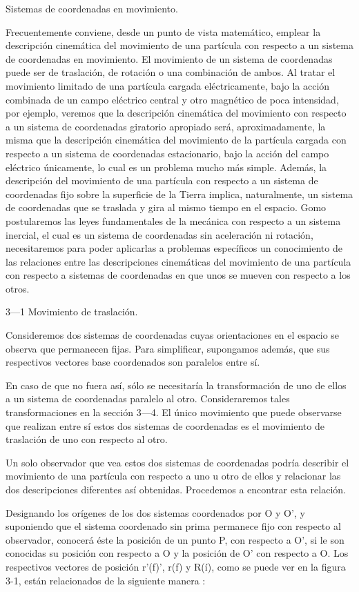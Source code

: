 Sistemas de coordenadas en movimiento.


Frecuentemente conviene, desde un punto de vista matemático, emplear la descripción cinemática del movimiento de una partícula con respecto a un sistema de coordenadas en movimiento. El movimiento de un sistema de coordenadas puede ser de traslación, de rotación o una combinación de ambos. Al tratar el movimiento limitado de una partícula cargada eléctricamente, bajo la acción combinada de un campo eléctrico central y otro magnético de poca intensidad, por ejemplo, veremos que la descripción cinemática del movimiento con respecto a un sistema de coordenadas giratorio apropiado será, aproximadamente, la misma que la descripción cinemática del movimiento de la partícula cargada con respecto a un sistema de coordenadas estacionario, bajo la acción del campo eléctrico únicamente, lo cual es un problema mucho más simple. Además, la descripción del movimiento de una partícula con respecto a un sistema de coordenadas fijo sobre la superficie de la Tierra implica, naturalmente, un sistema de coordenadas que se traslada y gira al mismo tiempo en el espacio. Gomo postularemos las leyes fundamentales de la mecánica con respecto a un sistema inercial, el cual es un sistema de coordenadas sin aceleración ni rotación, necesitaremos para poder aplicarlas a problemas específicos un conocimiento de las relaciones entre las descripciones cinemáticas del movimiento de una partícula con respecto a sistemas de coordenadas en que unos se mueven con respecto a los otros. 

3—1 Movimiento de traslación. 

Consideremos dos sistemas de coordenadas cuyas orientaciones en el espacio se observa que permanecen fijas. Para simplificar, supongamos además, que sus respectivos vectores base coordenados son paralelos entre sí.

En caso de que no fuera así, sólo se necesitaría la transformación de uno de ellos a un sistema de coordenadas paralelo al otro. Consideraremos tales transformaciones en la sección 3—4. El único movimiento que puede observarse que realizan entre sí estos dos sistemas de coordenadas es el movimiento de traslación de uno con respecto al otro. 

Un solo observador que vea estos dos sistemas de coordenadas podría describir el movimiento de una partícula con respecto a uno u otro de ellos y relacionar las dos descripciones diferentes así obtenidas. Procedemos a encontrar esta relación. 

Designando los orígenes de los dos sistemas coordenados por O y O', y suponiendo que el sistema coordenado sin prima permanece fijo con respecto al observador, conocerá éste la posición de un punto P, con respecto a O', si le son conocidas su posición con respecto a O y la posición de O' con respecto a O. Los respectivos vectores de posición r'(f)’, r(f) y R(í), como se puede ver en la figura 3-1, están relacionados de la siguiente manera : 


